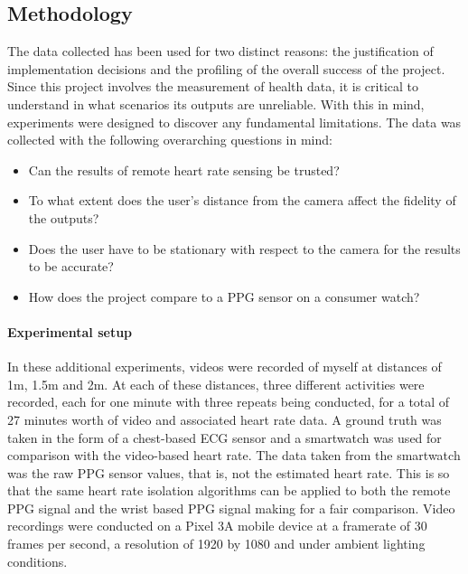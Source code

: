 \subsection{Methodology}
The data collected has been used for two distinct reasons: the justification of implementation decisions and the profiling of the overall success of the project.
Since this project involves the measurement of health data, it is critical to understand in what scenarios its outputs are unreliable.
With this in mind, experiments were designed to discover any fundamental limitations. The data was collected with the following overarching questions in mind:
\begin{itemize}
    \item Can the results of remote heart rate sensing be trusted?
    \item To what extent does the user's distance from the camera affect the fidelity of the outputs?
    \item Does the user have to be stationary with respect to the camera for the results to be accurate?
    \item How does the project compare to a PPG sensor on a consumer watch?
\end{itemize}


\paragraph{Experimental setup}
In these additional experiments, videos were recorded of myself at distances of 1m, 1.5m and 2m. 
At each of these distances, three different activities were recorded, each for one minute with three repeats being conducted, for a total of 27 minutes worth of video and associated heart rate data.
A ground truth was taken in the form of a chest-based ECG sensor and a smartwatch was used for comparison with the video-based heart rate.
The data taken from the smartwatch was the raw PPG sensor values, that is, not the estimated heart rate. This is so that the same heart rate isolation algorithms can be applied to both the 
remote PPG signal and the wrist based PPG signal making for a fair comparison.
Video recordings were conducted on a Pixel 3A mobile device at a framerate of 30 frames per second, a resolution of 1920 by 1080 and under ambient lighting conditions.

